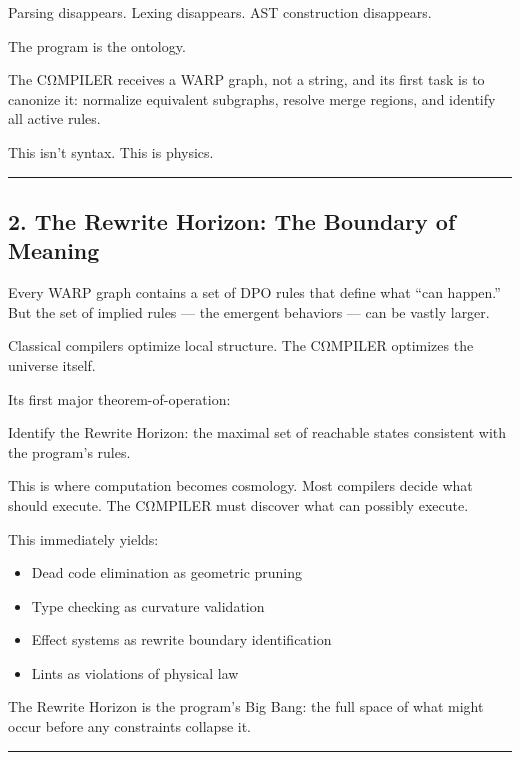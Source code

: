 Parsing disappears. Lexing disappears. AST construction disappears.

The program is the ontology.

The CΩMPILER receives a WARP graph, not a string, and its first task is to
canonize it: normalize equivalent subgraphs, resolve merge regions, and
identify all active rules.

This isn't syntax. This is physics.

\begin{center}\rule{0.5\linewidth}{0.5pt}\end{center}

\subsection{2. The Rewrite Horizon: The Boundary of
Meaning}\label{the-rewrite-horizon-the-boundary-of-meaning}

Every WARP graph contains a set of DPO rules that define what ``can happen.''
But the set of implied rules --- the emergent behaviors --- can be
vastly larger.

Classical compilers optimize local structure. The CΩMPILER optimizes the
universe itself.

Its first major theorem-of-operation:

Identify the Rewrite Horizon: the maximal set of reachable states
consistent with the program's rules.

This is where computation becomes cosmology. Most compilers decide what
should execute. The CΩMPILER must discover what can possibly execute.

This immediately yields:

\begin{itemize}
\tightlist
\item
  Dead code elimination as geometric pruning
\item
  Type checking as curvature validation
\item
  Effect systems as rewrite boundary identification
\item
  Lints as violations of physical law
\end{itemize}

The Rewrite Horizon is the program's Big Bang: the full space of what
might occur before any constraints collapse it.

\begin{center}\rule{0.5\linewidth}{0.5pt}\end{center}

